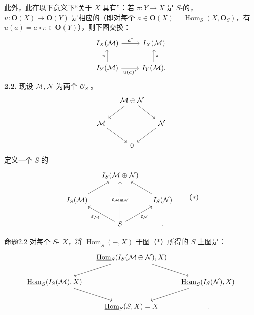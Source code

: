 此外，此在以下意义下“关于 $X$ 具有”：若 $\pi:Y\to X$ 是 $S$-的，$u:\mathbf O(X)\to\mathbf O(Y)$ 是相应的（即对每个 $a\in\mathbf O(X)=\operatorname{Hom}_S(X,\mathbf O_S)$，有 $u(a)=a\circ\pi\in\mathbf O(Y)$），则下图交换：
\[
\begin{tikzcd}
I_X(\mathcal M)\arrow[r,"a^*"]&I_X(\mathcal M)\\
I_Y(\mathcal M)\arrow[u,"\pi"]\arrow[r,"u(a)^*"']&I_Y(\mathcal M)\arrow[u,"\pi"'].
\end{tikzcd}
\]
\textbf{2.2.} 现设 $\mathcal M,\mathcal N$ 为两个 $\mathcal O_S$-。
\[
\begin{tikzcd}[column sep=small]
&\mathcal M\oplus\mathcal N\arrow[dl]\arrow[dr]&\\
\mathcal M\arrow[dr]&&\mathcal N\arrow[dl]\\
&0&
\end{tikzcd}
\]
定义一个 $S$-的
\[
\begin{tikzcd}[column sep=small]
&I_S(\mathcal M\oplus\mathcal N)&\\
I_S(\mathcal M)\arrow[ur]&&I_S(\mathcal N)\arrow[ul]\\
&S\arrow[ul,"\varepsilon_{\mathcal M}"]\arrow[uu,"\varepsilon_{\mathcal M\oplus\mathcal N}" description]\arrow[ur,"\varepsilon_{\mathcal N}"']&.
\end{tikzcd}\tag{$*$}
\]
\begin{SGAresult}{命题}{2.2}
对每个 $S$- $X$，将 $\underline{\operatorname{Hom}}_S(-,X)$ 于图（$*$）所得的 $S$ 上图是：
\[
\begin{tikzcd}[column sep=small]
&\underline{\operatorname{Hom}}_S(I_S(\mathcal M\oplus\mathcal N),X)\arrow[dl]\arrow[dr]&\\
\underline{\operatorname{Hom}}_S(I_S(\mathcal M),X)\arrow[dr]&&\underline{\operatorname{Hom}}_S(I_S(\mathcal N),X)\arrow[dl]\\
&\underline{\operatorname{Hom}}_S(S,X)=X&.
\end{tikzcd}
\]
\end{SGAresult}
